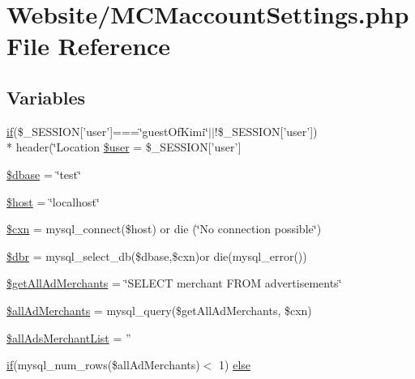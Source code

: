 \hypertarget{_m_c_maccount_settings_8php}{\section{Website/\-M\-C\-Maccount\-Settings.php File Reference}
\label{_m_c_maccount_settings_8php}
}
\subsection*{Variables}
\begin{DoxyCompactItemize}
\item 
\hyperlink{_m_c_mhome_page_8php_a8dec719c1645067d1065f7f064d4b967}{if}(\$\-\_\-\-S\-E\-S\-S\-I\-O\-N\mbox{[}'user'\mbox{]}===\char`\"{}guest\-Of\-Kimi\char`\"{}$|$$|$!\$\-\_\-\-S\-E\-S\-S\-I\-O\-N\mbox{[}'user'\mbox{]}) \\*
header(\char`\"{}Location \hyperlink{_m_c_maccount_settings_8php_ad8982953e969b35c48447e32be546dca}{\$user} = \$\-\_\-\-S\-E\-S\-S\-I\-O\-N\mbox{[}'user'\mbox{]}
\item 
\hyperlink{_m_c_maccount_settings_8php_abd981912075cb8356ca370b4fefdfed7}{\$dbase} = \char`\"{}test\char`\"{}
\item 
\hyperlink{_m_c_maccount_settings_8php_a711797613cb863ca0756df789c396bf2}{\$host} = \char`\"{}localhost\char`\"{}
\item 
\hyperlink{_m_c_maccount_settings_8php_afe14c5bdb9487c058ec831382f1fbacd}{\$cxn} = mysql\-\_\-connect(\$host) or die (\char`\"{}No connection possible\char`\"{})
\item 
\hyperlink{_m_c_maccount_settings_8php_a88fea670240e5fa6ae306a286acaa0fd}{\$dbr} = mysql\-\_\-select\-\_\-db(\$dbase,\$cxn)or die(mysql\-\_\-error())
\item 
\hyperlink{_m_c_maccount_settings_8php_a0c83e0e6bd8e9d8deee8baa4f03f6fc2}{\$get\-All\-Ad\-Merchants} = \char`\"{}S\-E\-L\-E\-C\-T merchant F\-R\-O\-M advertisements\char`\"{}
\item 
\hyperlink{_m_c_maccount_settings_8php_a8a13c248d6e767ec3a93debb562f3a3f}{\$all\-Ad\-Merchants} = mysql\-\_\-query(\$get\-All\-Ad\-Merchants, \$cxn)
\item 
\hyperlink{_m_c_maccount_settings_8php_a17349accdafb921446876ffa9476c666}{\$all\-Ads\-Merchant\-List} = ''
\item 
\hyperlink{_m_c_mhome_page_8php_a8dec719c1645067d1065f7f064d4b967}{if}(mysql\-\_\-num\-\_\-rows(\$all\-Ad\-Merchants)$<$ 1) \hyperlink{_m_c_maccount_settings_8php_a94047f62b6235a950eb5b1c60eecf257}{else}
$$
\end{DoxyCompactItemize}
